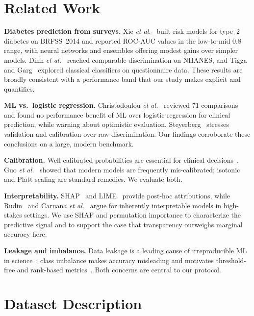 \documentclass[conference]{IEEEtran}
\begin{document}
\section{Related Work}
\textbf{Diabetes prediction from surveys.} Xie \emph{et al.}~\cite{xie2019building}
built risk models for type~2 diabetes on BRFSS~2014 and reported ROC-AUC values in the
low-to-mid $0.8$ range, with neural networks and ensembles offering modest gains over
simpler models. Dinh \emph{et al.}~\cite{dinh2019data} reached comparable
discrimination on NHANES, and Tigga and Garg~\cite{tigga2020prediction} explored
classical classifiers on questionnaire data. These results are broadly consistent with
a performance band that our study makes explicit and quantifies.

\textbf{ML vs.\ logistic regression.} Christodoulou
\emph{et al.}~\cite{christodoulou2019systematic} reviewed 71 comparisons and found no
performance benefit of ML over logistic regression for clinical prediction, while
warning about optimistic evaluation. Steyerberg~\cite{steyerberg2019validation}
stresses validation and calibration over raw discrimination. Our findings corroborate
these conclusions on a large, modern benchmark.

\textbf{Calibration.} Well-calibrated probabilities are essential for clinical
decisions~\cite{vancalster2019calibration,niculescu2005predicting}. Guo
\emph{et al.}~\cite{guo2017calibration} showed that modern models are frequently
mis-calibrated; isotonic and Platt scaling are standard remedies. We evaluate both.

\textbf{Interpretability.} SHAP~\cite{lundberg2017shap,lundberg2020local} and
LIME~\cite{ribeiro2016lime} provide post-hoc attributions, while
Rudin~\cite{rudin2019stop} and Caruana \emph{et al.}~\cite{caruana2015intelligible}
argue for inherently interpretable models in high-stakes settings. We use SHAP and
permutation importance to characterize the predictive signal and to support the case
that transparency outweighs marginal accuracy here.

\textbf{Leakage and imbalance.} Data leakage is a leading cause of irreproducible ML
in science~\cite{kaufman2012leakage,kapoor2023leakage}; class imbalance makes accuracy
misleading and motivates threshold-free and rank-based
metrics~\cite{saito2015precision,he2009learning,chicco2020mcc}. Both concerns are
central to our protocol.

\section{Dataset Description}
\end{document}

